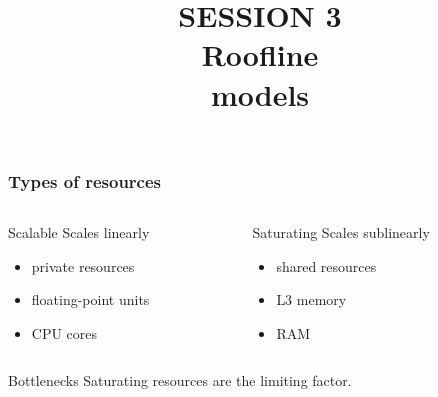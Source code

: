 \documentclass[dvipsnames,presentation,aspectratio=169,14pt]{beamer}
\date{}
\begin{document}
\title{\firasemibold\color{White}%
  {\fontsize{20}{0}\selectfont SESSION 3\\
    \fontsize{40}{40}\selectfont Roofline\\models\par}}
\titleslide

\begin{frame}
  \frametitle{Types of resources}

  \begin{columns}
    \begin{column}{0.48\textwidth}
      \begin{block}{Scalable\phantom{g}}
        Scales linearly
        \begin{itemize}[itemsep=6pt]
        \item private resources
        \item floating-point units
        \item CPU cores
        \end{itemize}
      \end{block}
    \end{column}
    \begin{column}{0.48\textwidth}
      \begin{block}{Saturating}
        Scales sublinearly
        \begin{itemize}[itemsep=6pt]
        \item shared resources
        \item L3 memory
        \item RAM
        \end{itemize}
      \end{block}
    \end{column}
  \end{columns}

  \vskip 15pt
  \pause
  \begin{challenge}{Bottlenecks}
    Saturating resources are the limiting factor.
  \end{challenge}

\end{frame}
\end{document}
